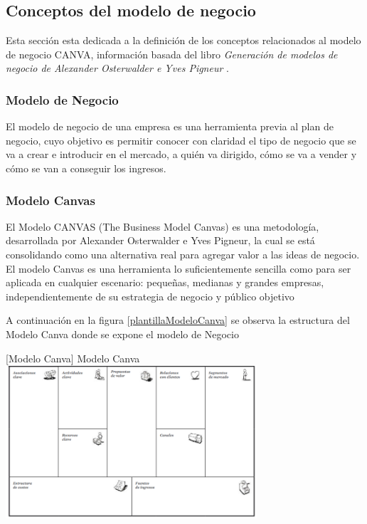 \subsection{Conceptos del modelo de negocio}


Esta sección esta dedicada a la definición de los conceptos relacionados al modelo de negocio CANVA, información basada del libro \textit{Generación de modelos de negocio de Alexander Osterwalder e Yves Pigneur} \cite{osterwalder2011generacion}.

\subsubsection*{Modelo de Negocio}

El modelo de negocio de una empresa es una herramienta previa al plan de negocio, cuyo objetivo es permitir conocer con claridad el tipo de negocio que se va a crear e introducir en el mercado, a quién va dirigido, cómo se va a vender y cómo se van a conseguir los ingresos. \cite{peiro_2022}


\subsubsection*{Modelo Canvas}
El Modelo CANVAS (The Business Model Canvas) es una metodología, desarrollada por Alexander Osterwalder e Yves Pigneur, la cual se está consolidando como una alternativa real para agregar valor a las ideas de negocio. El modelo Canvas es una herramienta lo suficientemente sencilla como para ser aplicada en cualquier escenario: pequeñas, medianas y grandes empresas, independientemente  de su estrategia de negocio y público objetivo

A continuación en la figura \ref{plantillaModeloCanva} se observa la estructura del Modelo Canva donde se expone el modelo de Negocio

\vspace{2mm}
\begin{minipage}{0.9\textwidth}
\centering
{}[{Modelo Canva}]{ Modelo Canva }
\label{plantillaModeloCanva}
 \includegraphics[width=0.7\textwidth]{Images/canva.png}
\end{minipage}

